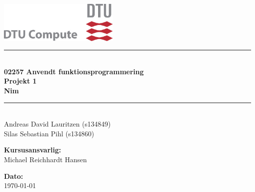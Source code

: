 \begin{titlepage}
    \begin{minipage}{0.3\textwidth}
\begin{flushleft}
\end{flushleft}\end{minipage}\hfill
\begin{minipage}{0.3\textwidth}
\begin{flushright}\vspace{-1cm}
\includegraphics[height=2cm]{fig/Logo_DTU_IMM.jpg}
\end{flushright}
\end{minipage}
	\begin{center}
		\vspace*{2cm}
		\rule{\textwidth}{1mm}\\
		\vspace{0.7cm}
		{\Huge\bfseries
		02257 Anvendt funktionsprogrammering \\ \vspace*{0.5cm}
		Projekt 1\\ \vspace*{0.5cm}
		Nim \vspace{0.7cm}}
		\rule{\textwidth}{1mm}\\
    	\vspace{2.5cm}
		\large
		Andreas David Lauritzen (s134849)\\
		\vspace*{0.2cm}
		Silas Sebastian Pihl (s134860)\\
	\end{center}
	\vfill
	
	\begin{minipage}[b]{0.5\textwidth}
    \begin{flushleft}
	\textbf{Kursusansvarlig:}\\
	Michael Reichhardt Hansen \\ 
    \end{flushleft}
    \end{minipage}
	\begin{minipage}[b]{0.5\textwidth}
    \begin{flushright}
	\textbf{Dato:}\\
	\today \\ 
    \end{flushright}
    \end{minipage}
	
\end{titlepage}